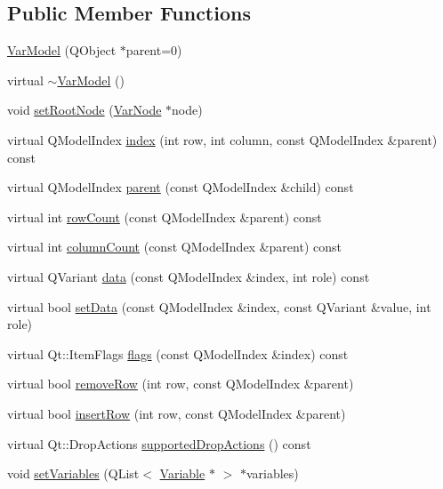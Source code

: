 \subsection*{Public Member Functions}
\begin{DoxyCompactItemize}
\item 
\hyperlink{class_var_model_aaf9bfecea80099912822f65e7eb99864}{VarModel} (QObject $\ast$parent=0)
\item 
virtual \hyperlink{class_var_model_afdaca6fadbdbaf69127190d3e072dc0a}{$\sim$VarModel} ()
\item 
void \hyperlink{class_var_model_a8ef7f8ea4fe2c809b615da5e6b74753e}{setRootNode} (\hyperlink{class_var_node}{VarNode} $\ast$node)
\item 
virtual QModelIndex \hyperlink{class_var_model_a100935873eee583b23f0e2b65250c39e}{index} (int row, int column, const QModelIndex \&parent) const 
\item 
virtual QModelIndex \hyperlink{class_var_model_ae536b47275ee0a121362af7993488d9b}{parent} (const QModelIndex \&child) const 
\item 
virtual int \hyperlink{class_var_model_af6ee08eb2dfe4ad4108b3d020f2b4a1b}{rowCount} (const QModelIndex \&parent) const 
\item 
virtual int \hyperlink{class_var_model_a35985e6b3708021407da2421373f1b1f}{columnCount} (const QModelIndex \&parent) const 
\item 
virtual QVariant \hyperlink{class_var_model_a94846999c6037464ad180e7b951f1839}{data} (const QModelIndex \&index, int role) const 
\item 
virtual bool \hyperlink{class_var_model_a1e47852c1540589123d0c02e170a4eed}{setData} (const QModelIndex \&index, const QVariant \&value, int role)
\item 
virtual Qt::ItemFlags \hyperlink{class_var_model_aac148a7677190bd417b355bcb365ce95}{flags} (const QModelIndex \&index) const 
\item 
virtual bool \hyperlink{class_var_model_a1cea9bad96bde13eb990a782fa2944c3}{removeRow} (int row, const QModelIndex \&parent)
\item 
virtual bool \hyperlink{class_var_model_a2e3d891e55c8798b6715589af082fa04}{insertRow} (int row, const QModelIndex \&parent)
\item 
virtual Qt::DropActions \hyperlink{class_var_model_ad8538d1f9ec69a02e533c380c2727a3f}{supportedDropActions} () const 
\item 
void \hyperlink{class_var_model_ab2931d9bf280635b3cc448a67a76ed32}{setVariables} (QList$<$ \hyperlink{class_variable}{Variable} $\ast$ $>$ $\ast$variables)

\end{DoxyCompactItemize}
